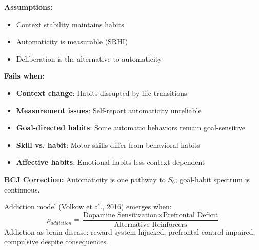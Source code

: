 \begin{tcolorbox}[colback=red!5!white, colframe=red!75!black, title=Boundary Condition: Where Automaticity Model Fails]
\textbf{Assumptions:}
\begin{itemize}[nosep]
\item Context stability maintains habits
\item Automaticity is measurable (SRHI)
\item Deliberation is the alternative to automaticity
\end{itemize}

\textbf{Fails when:}
\begin{itemize}[nosep]
\item \textbf{Context change}: Habits disrupted by life transitions
\item \textbf{Measurement issues}: Self-report automaticity unreliable
\item \textbf{Goal-directed habits}: Some automatic behaviors remain goal-sensitive
\item \textbf{Skill vs. habit}: Motor skills differ from behavioral habits
\item \textbf{Affective habits}: Emotional habits less context-dependent
\end{itemize}

\textbf{BCJ Correction:} Automaticity is one pathway to $S_6$; goal-habit spectrum is continuous.
\end{tcolorbox}


\begin{theorem}
\label{thm:addiction-neuroscience}
Addiction model (Volkow et al., 2016) emerges when:
\begin{equation}
\boxed{\rho_{addiction} = \frac{\text{Dopamine Sensitization} \times \text{Prefrontal Deficit}}{\text{Alternative Reinforcers}}}
\end{equation}
Addiction as brain disease: reward system hijacked, prefrontal control impaired, compulsive despite consequences.
\end{theorem}

